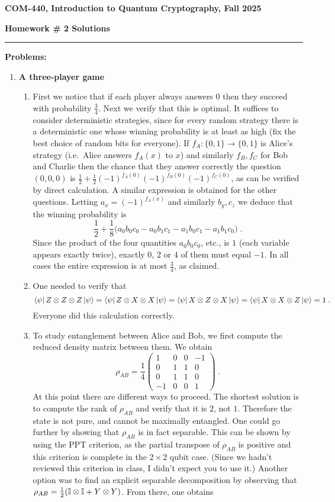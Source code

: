 \documentclass[12pt]{article}
\newcommand{\header}[1]{\begin{center} {\large\bf #1} \end{center}}
\begin{document}
\header{COM-440, Introduction to Quantum Cryptography, Fall 2025}
{\bf Homework \# 2 Solutions} 


\medskip

\hrule

 
\medskip
{\bf Problems:}

\begin{enumerate}
		
\item {\bf A three-player game}
\begin{enumerate}
\item First we notice that if each player always answers $0$ then they succeed with probability $\frac34$. Next we verify that this is optimal. It suffices to consider deterministic strategies, since for every random strategy there is a deterministic one whose winning probability is at least as high (fix the best choice of random bits for everyone). If $f_A:\{0,1\}\to\{0,1\}$ is Alice's strategy (i.e.\ Alice answers $f_A(x)$ to $x$) and similarly $f_B,f_C$ for Bob and Charlie then the chance that they answer correctly the question $(0,0,0)$ is $\frac{1}{2}+\frac12 (-1)^{f_A(0)}(-1)^{f_B(0)}(-1)^{f_C(0)}$, as can be verified by direct calculation. A similar expression is obtained for the other questions. Letting $a_x=(-1)^{f_A(x)}$ and similarly $b_y,c_z$ we deduce that the winning probability is 
\[\frac12+\frac18\big( a_0b_0c_0 -a_0b_1c_1 - a_1b_0c_1 - a_1 b_1 c_0\big)\;.\]
Since the product of the four quantities $a_0b_0c_0$, etc., is $1$ (each variable appears exactly twice), exactly $0$, $2$ or $4$ of them must equal $-1$. In all cases the entire expression is at most $\frac34$, as claimed.  
\item One needed to verify that 
\[ \bra{\psi} Z\otimes Z \otimes Z \ket{\psi}=\bra{\psi} Z\otimes X \otimes X \ket{\psi}=\bra{\psi} X\otimes Z \otimes X \ket{\psi}=\bra{\psi} X\otimes X \otimes Z \ket{\psi}=1\;.\]
Everyone did this calculation correctly. 
\item To study entanglement between Alice and Bob, we first compute the reduced density matrix between them. We obtain 
\[ \rho_{AB} = \frac14\begin{pmatrix} 1 & 0 & 0 & -1 \\ 0 & 1 & 1 & 0 \\ 0 & 1 & 1 & 0 \\ -1 & 0 & 0 & 1 \end{pmatrix}\;.\]
At this point there are different ways to proceed. The shortest solution is to compute the rank of $\rho_{AB}$ and verify that it is $2$, not $1$. Therefore the state is not pure, and cannot be maximally entangled. One could go further by showing that  $\rho_{AB} $ is in fact separable. This can be shown by using the PPT criterion, as the partial transpose of $\rho_{AB}$ is positive and this criterion is complete in the $2 \times 2$ qubit case. (Since we hadn't reviewed this criterion in class, I didn't expect you to use it.) Another option was to find an explicit separable decomposition by observing that  $\rho_{AB} = \frac{1}{2}(\mathbb{I} \otimes\mathbb{I} + Y\otimes Y)$. From there, one obtains  

\end{enumerate}
\end{enumerate}
\end{document}
